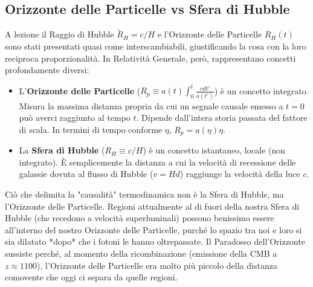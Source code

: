 \documentclass[11pt,a4paper]{report}
\begin{document}
\subsection{Orizzonte delle Particelle vs Sfera di Hubble}
A lezione il Raggio di Hubble $\tilde{R}_H = c/H$ e l'Orizzonte delle Particelle $R_H(t)$ sono stati presentati quasi come interscambiabili, giustificando la cosa con la loro reciproca proporzionalità. In Relatività Generale, però, rappresentano concetti profondamente diversi:
\begin{itemize}
    \item L'\textbf{Orizzonte delle Particelle} ($R_p \equiv a(t) \int_0^t \frac{c dt'}{a(t')}$) è un concetto integrato. Misura la massima distanza propria da cui un segnale causale emesso a $t=0$ può averci raggiunto al tempo $t$. Dipende dall'intera storia passata del fattore di scala. In termini di tempo conforme $\eta$, $R_p = a(\eta) \eta$.
    \item La \textbf{Sfera di Hubble} ($R_H \equiv c/H$) è un concetto istantaneo, locale (non integrato). È semplicemente la distanza a cui la velocità di recessione delle galassie dovuta al flusso di Hubble ($v = Hd$) raggiunge la velocità della luce $c$.
\end{itemize}
Ciò che delimita la "causalità" termodinamica non è la Sfera di Hubble, ma l'Orizzonte delle Particelle. Regioni attualmente al di fuori della nostra Sfera di Hubble (che recedono a velocità superluminali) possono benissimo essere all'interno del nostro Orizzonte delle Particelle, purché lo spazio tra noi e loro si sia dilatato *dopo* che i fotoni le hanno oltrepassate. Il Paradosso dell'Orizzonte sussiste perché, al momento della ricombinazione (emissione della CMB a $z \approx 1100$), l'Orizzonte delle Particelle era molto più piccolo della distanza comovente che oggi ci separa da quelle regioni.
\end{document}
